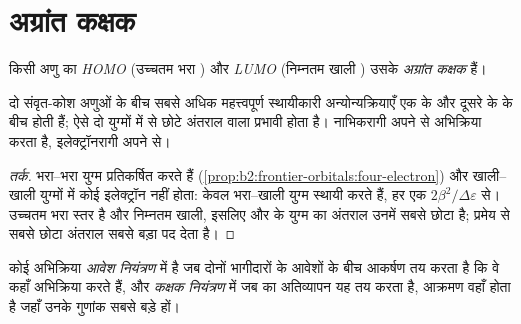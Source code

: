 \section{अग्रांत कक्षक}

\begin{definition}[अग्रांत कक्षक]\label{def:b2:frontier-orbitals:frontier}
किसी अणु का \emph{HOMO} (उच्चतम भरा ) और
\emph{LUMO} (निम्नतम खाली ) उसके
\emph{अग्रांत कक्षक} हैं।
\end{definition}

\begin{proposition}[प्रभावी अन्योन्यक्रिया]\label{prop:b2:frontier-orbitals:dominant}
दो संवृत-कोश अणुओं के बीच सबसे अधिक महत्त्वपूर्ण स्थायीकारी अन्योन्यक्रियाएँ
एक के  और दूसरे के  के बीच होती हैं; ऐसे दो युग्मों में से
छोटे अंतराल वाला प्रभावी होता है। नाभिकरागी अपने  से अभिक्रिया करता है,
इलेक्ट्रॉनरागी अपने  से।
\end{proposition}

\begin{proof}[तर्क]
भरा--भरा युग्म प्रतिकर्षित करते हैं (\cref{prop:b2:frontier-orbitals:four-electron}) और खाली--खाली
युग्मों में कोई इलेक्ट्रॉन नहीं होता: केवल भरा--खाली युग्म स्थायी करते हैं, हर एक $2\beta^2/\Delta\varepsilon$ से।
 उच्चतम भरा स्तर है और  निम्नतम खाली, इसलिए
 और  के युग्म का अंतराल उनमें सबसे छोटा है; प्रमेय से सबसे छोटा अंतराल
सबसे बड़ा पद देता है।
\end{proof}

\begin{definition}[आवेश नियंत्रण और कक्षक नियंत्रण]\label{def:b2:frontier-orbitals:control}
कोई अभिक्रिया \emph{आवेश नियंत्रण} में है जब दोनों भागीदारों के
आवेशों के बीच आकर्षण तय करता है कि वे कहाँ अभिक्रिया करते हैं, और
\emph{कक्षक नियंत्रण} में जब  का अतिव्यापन
यह तय करता है, आक्रमण वहाँ होता है जहाँ उनके गुणांक सबसे बड़े हों।
\end{definition}

